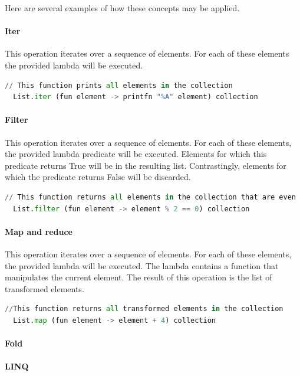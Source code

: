 \documentclass{article}
\begin{document}
Here are several examples of how these concepts may be applied.

\paragraph{Iter}
This operation iterates over a sequence of elements. For each of these elements the provided lambda will be executed.

\begin{lstlisting}[language=Python]
  // This function prints all elements in the collection
  List.iter (fun element -> printfn "%A" element) collection
\end{lstlisting}

\paragraph{Filter}
This operation iterates over a sequence of elements. For each of these elements, the provided lambda predicate will be executed.
Elements for which this predicate returns True will be in the resulting list. Contrastingly, elements for which the predicate returns False will be discarded.

\begin{lstlisting}[language=Python]
  // This function returns all elements in the collection that are even
  List.filter (fun element -> element % 2 == 0) collection
\end{lstlisting}

\paragraph{Map and reduce}
This operation iterates over a sequence of elements. For each of these elements, the provided lambda will be executed.
The lambda contains a function that manipulates the current element. The result of this operation is the list of transformed elements.

\begin{lstlisting}[language=Python]
  //This function returns all transformed elements in the collection
  List.map (fun element -> element + 4) collection
\end{lstlisting}
  
\paragraph{Fold}

\paragraph{LINQ}
\end{document}
